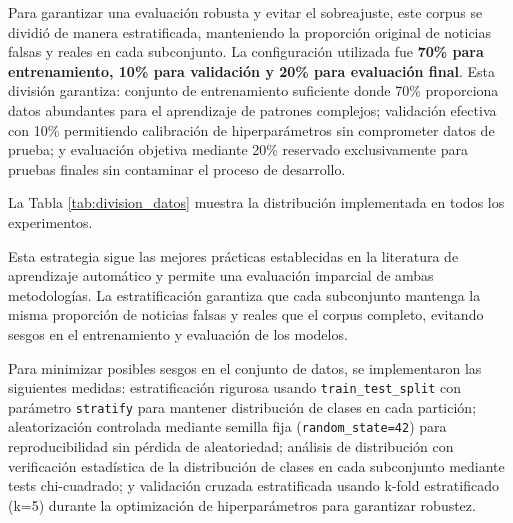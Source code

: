 Para garantizar una evaluación robusta y evitar el sobreajuste, este corpus se dividió de manera estratificada, manteniendo la proporción original de noticias falsas y reales en cada subconjunto. La configuración utilizada fue \textbf{70\% para entrenamiento, 10\% para validación y 20\% para evaluación final}. Esta división garantiza: conjunto de entrenamiento suficiente donde 70\% proporciona datos abundantes para el aprendizaje de patrones complejos; validación efectiva con 10\% permitiendo calibración de hiperparámetros sin comprometer datos de prueba; y evaluación objetiva mediante 20\% reservado exclusivamente para pruebas finales sin contaminar el proceso de desarrollo.

La Tabla \ref{tab:division_datos} muestra la distribución implementada en todos los experimentos.

\begin{table}[htbp]
\centering
{}
\caption{División estratificada del corpus para entrenamiento y evaluación.}
\label{tab:division_datos}
\end{table}

Esta estrategia sigue las mejores prácticas establecidas en la literatura de aprendizaje automático y permite una evaluación imparcial de ambas metodologías. La estratificación garantiza que cada subconjunto mantenga la misma proporción de noticias falsas y reales que el corpus completo, evitando sesgos en el entrenamiento y evaluación de los modelos.

Para minimizar posibles sesgos en el conjunto de datos, se implementaron las siguientes medidas: estratificación rigurosa usando \texttt{train\_test\_split} con parámetro \texttt{stratify} para mantener distribución de clases en cada partición; aleatorización controlada mediante semilla fija (\texttt{random\_state=42}) para reproducibilidad sin pérdida de aleatoriedad; análisis de distribución con verificación estadística de la distribución de clases en cada subconjunto mediante tests chi-cuadrado; y validación cruzada estratificada usando k-fold estratificado (k=5) durante la optimización de hiperparámetros para garantizar robustez.

